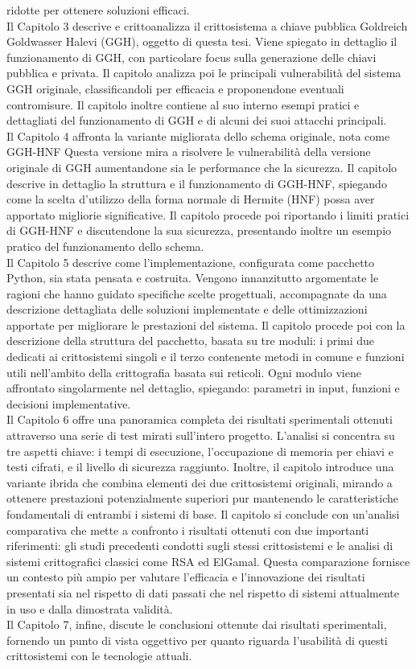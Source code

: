 ridotte per ottenere soluzioni efficaci. \\
Il Capitolo 3 descrive e crittoanalizza il crittosistema a chiave pubblica Goldreich 
Goldwasser Halevi (GGH), oggetto di questa tesi. Viene spiegato in dettaglio il funzionamento 
di GGH, con particolare focus sulla generazione delle chiavi pubblica e privata. 
Il capitolo analizza poi le principali vulnerabilità del sistema GGH originale, 
classificandoli per efficacia e proponendone eventuali
contromisure. Il capitolo inoltre contiene al suo interno esempi pratici e dettagliati del funzionamento 
di GGH e di alcuni dei suoi attacchi principali. \\
Il Capitolo 4 affronta la variante migliorata dello schema originale, nota come GGH-HNF 
Questa versione mira a risolvere le 
vulnerabilità della versione originale di GGH aumentandone sia le performance che la 
sicurezza. Il capitolo descrive in dettaglio la struttura e il funzionamento di GGH-HNF, 
spiegando come la scelta d'utilizzo della forma normale di Hermite (HNF) possa aver apportato 
migliorie significative. 
Il capitolo procede poi riportando i limiti pratici di GGH-HNF e discutendone la sua sicurezza, 
presentando inoltre un esempio pratico del funzionamento dello schema. \\
Il Capitolo 5 descrive come l'implementazione, configurata come pacchetto Python, sia stata pensata e 
costruita. Vengono innanzitutto argomentate le ragioni che hanno guidato specifiche scelte progettuali, 
accompagnate da una descrizione dettagliata delle soluzioni implementate e delle ottimizzazioni apportate 
per migliorare le prestazioni del sistema. Il capitolo procede poi con la descrizione della
struttura del pacchetto, basata su tre moduli: i primi due dedicati ai crittosistemi singoli e il 
terzo contenente metodi in comune e funzioni utili nell'ambito della crittografia basata sui reticoli. 
Ogni modulo viene affrontato singolarmente nel dettaglio, spiegando: parametri in input, funzioni e 
decisioni implementative. \\
Il Capitolo 6 offre una panoramica completa dei risultati sperimentali ottenuti attraverso una serie 
di test mirati sull'intero progetto. L'analisi si concentra su tre aspetti chiave: i tempi di esecuzione,
l'occupazione di memoria per chiavi e testi cifrati, e il livello di sicurezza raggiunto. Inoltre, 
il capitolo introduce una variante ibrida che combina elementi dei due crittosistemi originali, 
mirando a ottenere prestazioni potenzialmente superiori pur mantenendo le caratteristiche fondamentali 
di entrambi i sistemi di base. Il capitolo si conclude con un'analisi comparativa che mette a confronto 
i risultati 
ottenuti con due importanti riferimenti: gli studi precedenti condotti sugli stessi crittosistemi 
e le analisi di sistemi crittografici classici come RSA ed ElGamal. Questa comparazione fornisce un 
contesto più ampio per valutare l'efficacia e l'innovazione dei risultati presentati sia nel rispetto
di dati passati che nel rispetto di sistemi attualmente in uso e dalla dimostrata validità.\\ 
Il Capitolo 7, infine, discute le conclusioni ottenute dai risultati sperimentali, fornendo un punto 
di vista oggettivo per quanto riguarda l'usabilità di questi crittosistemi con le tecnologie attuali. 